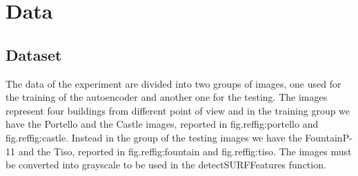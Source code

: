
\section{Data}
\subsection{Dataset}
The data of the experiment are divided into two groups of images, one used for the training of the autoencoder and another one for the testing. The images represent four buildings from different point of view and in the training group we have the Portello and the Castle images, reported in fig.ref{fig:portello} and fig.ref{fig:castle}. Instead in the group of the testing images we have the FountainP-11 and the Tiso, reported in fig.ref{fig:fountain} and fig.ref{fig:tiso}. The images must be converted into grayscale to be used in the detectSURFFeatures function.
